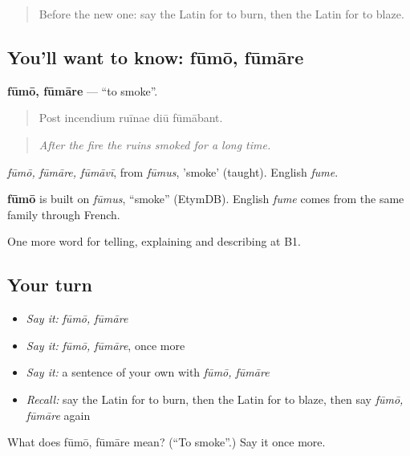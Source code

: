\begin{quote}
Before the new one: say the Latin for to burn, then the Latin for to blaze.
\end{quote}

\subsection*{You'll want to know: fūmō, fūmāre}
\textbf{fūmō, fūmāre} — \textquotedblleft{}to smoke\textquotedblright{}.

\begin{quote}
Post incendium ruīnae diū fūmābant.
\end{quote}

\begin{quote}
\emph{After the fire the ruins smoked for a long time.}
\end{quote}

\emph{fūmō, fūmāre, fūmāvī}, from \emph{fūmus}, 'smoke' (taught). English \emph{fume}.

\begin{cousinweb}
\textbf{fūmō} is built on \emph{fūmus}, \textquotedblleft{}smoke\textquotedblright{} (EtymDB). English \emph{fume} comes from the same family through French.
\end{cousinweb}

\begin{grammarlens}[title={What you've built}]
One more word for telling, explaining and describing at B1.
\end{grammarlens}

\subsection*{Your turn}
\begin{itemize}
\raggedright
  \item \emph{Say it:} \emph{fūmō, fūmāre}
  \item \emph{Say it:} \emph{fūmō, fūmāre}, once more
  \item \emph{Say it:} a sentence of your own with \emph{fūmō, fūmāre}
  \item \emph{Recall:} say the Latin for to burn, then the Latin for to blaze, then say \emph{fūmō, fūmāre} again
\end{itemize}

\begin{tcolorbox}[breakable,colback=teal!4,colframe=teal!35!black,title={Before you move on}]
What does fūmō, fūmāre mean? (\textquotedblleft{}To smoke\textquotedblright{}.) Say it once more.
\end{tcolorbox}
